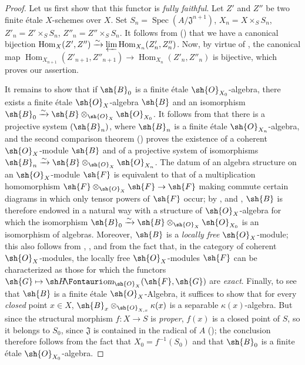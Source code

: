 \begin{proof}
Let us first show that this functor is \emph{fully faithful}.
Let $Z'$ and $Z''$ be two finite \'etale $X$-schemes over $X$.
Set $S_n=\operatorname{Spec}(A/\mathfrak{J}^{n+1})$, $X_n=X\times_S S_n$, $Z'_n=Z'\times_S S_n$, $Z''_n=Z''\times_S S_n$.
It follows from () that we have a canonical bijection $\operatorname{Hom}_X(Z',Z'')\xrightarrow{\sim}\varprojlim\operatorname{Hom}_{X_n}(Z'_n,Z''_n)$.
Now, by virtue of , the canonical map $\operatorname{Hom}_{X_{n+1}}(Z'_{n+1},Z''_{n+1})\to\operatorname{Hom}_{X_n}(Z'_n,Z''_n)$ is bijective, which proves our assertion.

It remains to show that if $\sh{B}_0$ is a finite \'etale $\sh{O}_{X_0}$-algebra, there exists a finite \'etale $\sh{O}_X$-algebra $\sh{B}$ and an isomorphism $\sh{B}_0\xrightarrow{\sim}\sh{B}\otimes_{\sh{O}_X}\sh{O}_{X_0}$.
It follows from  that there is a projective system $(\sh{B}_n)$, where $\sh{B}_n$ is a finite \'etale $\sh{O}_{X_n}$-algebra, and the second comparison theorem () proves the existence of a coherent $\sh{O}_X$-module $\sh{B}$ and of a projective system of isomorphisms $\sh{B}_n\xrightarrow{\sim}\sh{B}\otimes_{\sh{O}_X}\sh{O}_{X_n}$.
The datum of an algebra structure on an $\sh{O}_X$-module $\sh{F}$ is equivalent to that of a multiplication homomorphism $\sh{F}\otimes_{\sh{O}_X}\sh{F}\to\sh{F}$ making commute certain diagrams in which only tensor powers of $\sh{F}$ occur;
by ,  and , $\sh{B}$ is therefore endowed in a natural way with a structure of $\sh{O}_X$-algebra for which the isomorphism $\sh{B}_0\xrightarrow{\sim}\sh{B}\otimes_{\sh{O}_X}\sh{O}_{X_0}$ is an isomorphism of algebras.
Moreover, $\sh{B}$ is a \emph{locally free} $\sh{O}_X$-module;
this also follows from , ,  and from the fact that, in the category of coherent $\sh{O}_X$-modules, the locally free $\sh{O}_X$-modules $\sh{F}$ can be characterized as those for which the functors $\sh{G}\mapsto\shHom_{\sh{O}_X}(\sh{F},\sh{G})$ are \emph{exact}.
Finally, to see that $\sh{B}$ is a finite \'etale $\sh{O}_X$-Algebra, it suffices  to show that for every \emph{closed} point $x\in X$, $\sh{B}_x\otimes_{\sh{O}_{X,x}}\kappa(x)$ is a separable $\kappa(x)$-algebra.
But since the structural morphism $f:X\to S$ is \emph{proper}, $f(x)$ is a closed point of $S$, so it belongs to $S_0$, since $\mathfrak{J}$ is contained in the radical of $A$ ();
the conclusion therefore follows from the fact that $X_0=f^{-1}(S_0)$ and that $\sh{B}_0$ is a finite \'etale $\sh{O}_{X_0}$-algebra.
\end{proof}


